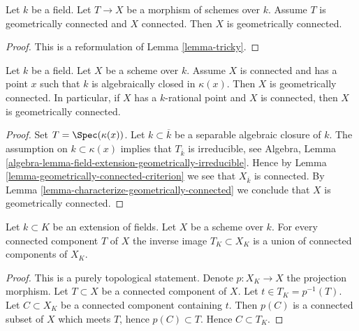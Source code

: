 \begin{lemma}
\label{lemma-geometrically-connected-criterion}
\begin{reference}
\cite[IV Corollary 4.5.13.1(i)]{EGA}
\end{reference}
Let $k$ be a field. Let $T \to X$ be a morphism of schemes over $k$.
Assume $T$ is geometrically connected and $X$ connected.
Then $X$ is geometrically connected.
\end{lemma}

\begin{proof}
This is a reformulation of
Lemma \ref{lemma-tricky}.
\end{proof}

\begin{lemma}
\label{lemma-geometrically-connected-if-connected-and-point}
Let $k$ be a field. Let $X$ be a scheme over $k$.
Assume $X$ is connected and has a point $x$ such that
$k$ is algebraically closed in $\kappa(x)$.
Then $X$ is geometrically connected.
In particular, if $X$ has a $k$-rational point and $X$ is connected,
then $X$ is geometrically connected.
\end{lemma}

\begin{proof}
Set $T = \Spec(\kappa(x))$. Let $k \subset \overline{k}$ be a
separable algebraic closure of $k$. The assumption on $k \subset \kappa(x)$
implies that $T_{\overline{k}}$ is irreducible, see
Algebra, Lemma \ref{algebra-lemma-field-extension-geometrically-irreducible}.
Hence by
Lemma \ref{lemma-geometrically-connected-criterion}
we see that $X_{\overline{k}}$ is connected. By
Lemma \ref{lemma-characterize-geometrically-connected}
we conclude that $X$ is geometrically connected.
\end{proof}

\begin{lemma}
\label{lemma-inverse-image-connected-component}
Let $k \subset K$ be an extension of fields.
Let $X$ be a scheme over $k$.
For every connected component $T$ of $X$ the inverse image
$T_K \subset X_K$ is a union of connected components of $X_K$.
\end{lemma}

\begin{proof}
This is a purely topological statement.
Denote $p : X_K \to X$ the projection morphism.
Let $T \subset X$ be a connected component of $X$.
Let $t \in T_K = p^{-1}(T)$. Let $C \subset X_K$ be a connected component
containing $t$. Then $p(C)$ is a connected subset of $X$
which meets $T$, hence $p(C) \subset T$. Hence $C \subset T_K$.
\end{proof}

